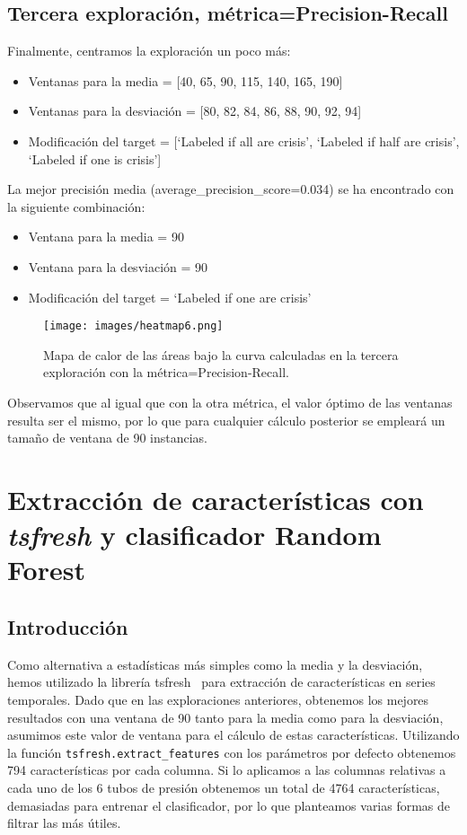 \documentclass[a4paper,12pt,twoside,oldfontcommands]{memoir}
\begin{document}
	\section{Tercera exploración, métrica=Precision-Recall}
	Finalmente, centramos la exploración un poco más: 
	\begin{itemize}
		\item Ventanas para la media = [40, 65, 90, 115, 140, 165, 190]
		\item Ventanas para la desviación = [80, 82, 84, 86, 88, 90, 92, 94]
		\item Modificación del target = [`Labeled if all are crisis', `Labeled if half are crisis', `Labeled if one is crisis']
	\end{itemize}
	
	La mejor precisión media (average\_precision\_score=0.034) se ha encontrado con la siguiente combinación: 
	\begin{itemize}
		\item Ventana para la media = 90
		\item Ventana para la desviación = 90
		\item Modificación del target = `Labeled if one are crisis'
	\end{itemize}
	
	\begin{figure}
		\centering
		\texttt{[image: images/heatmap6.png]}
		\caption{Mapa de calor de las áreas bajo la curva calculadas en la tercera exploración con la métrica=Precision-Recall.}
		\label{fig:heatmap6}
	\end{figure}
	
	Observamos que al igual que con la otra métrica, el valor óptimo de las ventanas resulta ser el mismo, por lo que para cualquier cálculo posterior se empleará un tamaño de ventana de 90 instancias. 
	
	\chapter{Extracción de características con \textit{tsfresh} y clasificador Random Forest}
	\section{Introducción}
	Como alternativa a estadísticas más simples como la media y la desviación, hemos utilizado la librería tsfresh~\cite{christ2018time} para extracción de características en series temporales. Dado que en las exploraciones anteriores, obtenemos los mejores resultados con una ventana de 90 tanto para la media como para la desviación, asumimos este valor de ventana para el cálculo de estas características. Utilizando la función \texttt{tsfresh.extract\_features} con los parámetros por defecto obtenemos 794 características por cada columna. Si lo aplicamos a las columnas relativas a cada uno de los 6 tubos de presión obtenemos un total de 4764 características, demasiadas para entrenar el clasificador, por lo que planteamos varias formas de filtrar las más útiles. 
	
\end{document}

